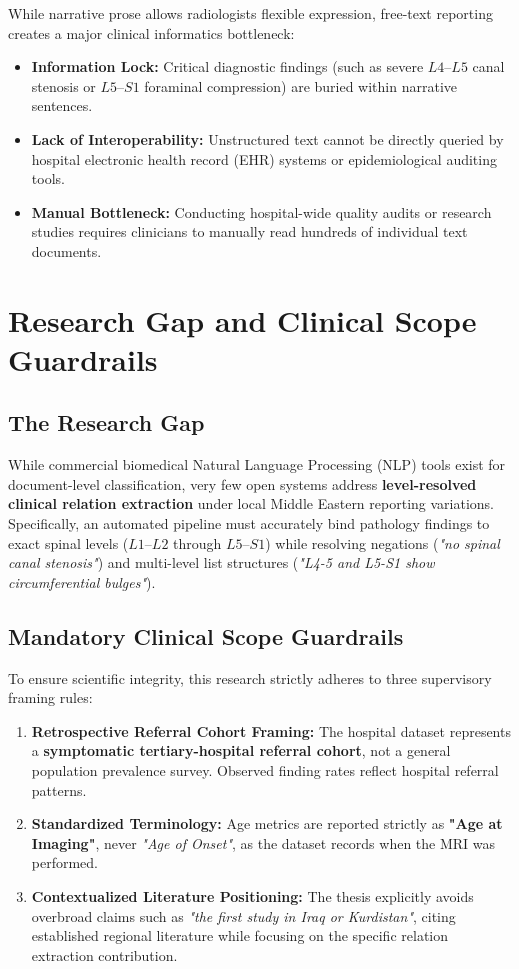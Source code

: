 While narrative prose allows radiologists flexible expression, free-text reporting creates a major clinical informatics bottleneck:
\begin{itemize}
    \item \textbf{Information Lock:} Critical diagnostic findings (such as severe $L4$--$L5$ canal stenosis or $L5$--$S1$ foraminal compression) are buried within narrative sentences.
    \item \textbf{Lack of Interoperability:} Unstructured text cannot be directly queried by hospital electronic health record (EHR) systems or epidemiological auditing tools.
    \item \textbf{Manual Bottleneck:} Conducting hospital-wide quality audits or research studies requires clinicians to manually read hundreds of individual text documents.
\end{itemize}

\section{Research Gap and Clinical Scope Guardrails}
\subsection{The Research Gap}
While commercial biomedical Natural Language Processing (NLP) tools exist for document-level classification, very few open systems address \textbf{level-resolved clinical relation extraction} under local Middle Eastern reporting variations. Specifically, an automated pipeline must accurately bind pathology findings to exact spinal levels ($L1$--$L2$ through $L5$--$S1$) while resolving negations (\textit{"no spinal canal stenosis"}) and multi-level list structures (\textit{"L4-5 and L5-S1 show circumferential bulges"}).

\subsection{Mandatory Clinical Scope Guardrails}
To ensure scientific integrity, this research strictly adheres to three supervisory framing rules:
\begin{enumerate}
    \item \textbf{Retrospective Referral Cohort Framing:} The hospital dataset represents a \textbf{symptomatic tertiary-hospital referral cohort}, not a general population prevalence survey. Observed finding rates reflect hospital referral patterns.
    \item \textbf{Standardized Terminology:} Age metrics are reported strictly as \textbf{"Age at Imaging"}, never \textit{"Age of Onset"}, as the dataset records when the MRI was performed.
    \item \textbf{Contextualized Literature Positioning:} The thesis explicitly avoids overbroad claims such as \textit{"the first study in Iraq or Kurdistan"}, citing established regional literature \cite{akreyi2012mri, saeed2019pattern} while focusing on the specific relation extraction contribution.
\end{enumerate}

